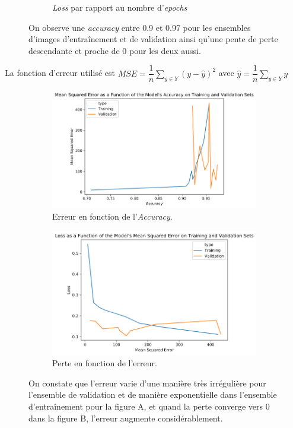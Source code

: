 \documentclass[french]{article}
\theoremstyle{mytheoremstyle}
\theoremstyle{mytheoremstyle}
\theoremstyle{myproblemstyle}
\begin{document}
\begin{figure}[H]
\begin{subfigure}[t]{0.5\textwidth}
            \caption{\emph{Loss} par rapport au nombre d'\emph{epochs}}
    \end{subfigure}
    \caption{On observe une \emph{accuracy} entre 0.9 et 0.97 pour les ensembles d'images d'entraînement et de validation ainsi qu'une pente de perte descendante et proche de 0 pour les deux aussi.}
    \end{figure}

    La fonction d'erreur utilisé est $MSE = \dfrac{1}{n}\sum\limits_{y \in Y} (y - \hat{y})^2$ avec $\hat{y}=\dfrac{1}{n}\sum\limits_{y \in Y} y$
    
    \begin{figure}[H]
    \centering
    \begin{subfigure}[t]{0.5\textwidth}
            \centering
            \includegraphics[width=1\linewidth]{images/cnn_mse_acc.png}
            \caption{Erreur en fonction de l'\emph{Accuracy}.}
    \end{subfigure}%
    \begin{subfigure}[t]{0.5\textwidth}
            \centering
            \includegraphics[width=0.95\linewidth]{images/cnn_loss_mse.png}
            \caption{Perte en fonction de l'erreur.}
    \end{subfigure}
    \caption{On constate que l'erreur varie d'une manière très irrégulière pour l'ensemble de validation et de manière exponentielle dans l'ensemble d'entraînement pour la figure A, et quand la perte converge vers 0 dans la figure B, l'erreur augmente considérablement.}
    \end{figure}
    
\end{document}
